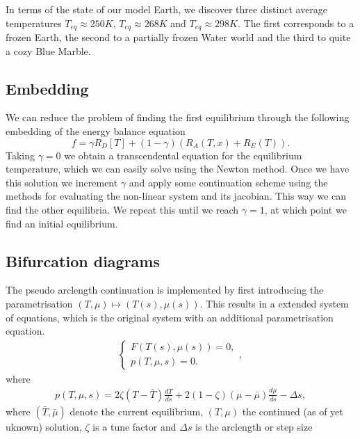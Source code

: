 In terms of the state of our model Earth, we discover three distinct average temperatures $T_{eq} \approx 250 K$, $T_{eq} \approx 268 K$ and $T_{eq} \approx 298 K$.
The first corresponds to a frozen Earth, the second to a partially frozen Water world and the third to quite a cozy Blue Marble.

\subsection{Embedding}
    We can reduce the problem of finding the first equilibrium through the following embedding of the energy balance equation
    \begin{equation}
        f = \gamma R_D[T] + (1-\gamma)(R_A(T, x) + R_E(T)).
    \end{equation}
    Taking $\gamma = 0$ we obtain a transcendental equation for the equilibrium temperature, which we can easily solve using the Newton method.
    Once we have this solution we increment $\gamma$ and apply some continuation scheme using the methods for evaluating the non-linear system and
    its jacobian. This way we can find the other equilibria. We repeat this until we reach $\gamma = 1$, at which point we find an initial equilibrium.
    
\subsection{Bifurcation diagrams}
    The pseudo arclength continuation is implemented by first introducing the parametrisation $(T, \mu)\mapsto(T(s), \mu(s))$. This results in a extended 
    system of equations, which is the original system with an additional parametrisation equation.
    \begin{align*}
        \begin{cases}
            F(T(s), \mu(s)) = 0,\\
            p(T, \mu, s) = 0.
        \end{cases},
    \end{align*}
    where 
    \begin{align*}
        p(T, \mu, s) = 2\zeta(T - \bar{T})\frac{d T}{ds} + 2(1-\zeta)(\mu - \bar{\mu})\frac{d \mu}{ds} - \Delta s,
    \end{align*}
    where $(\bar{T}, \bar{\mu})$ denote the current equilibrium, $(T, \mu)$ the continued (as of yet uknown) solution, 
    $\zeta$ is a tune factor and $\Delta s$ is the arclength or step size

